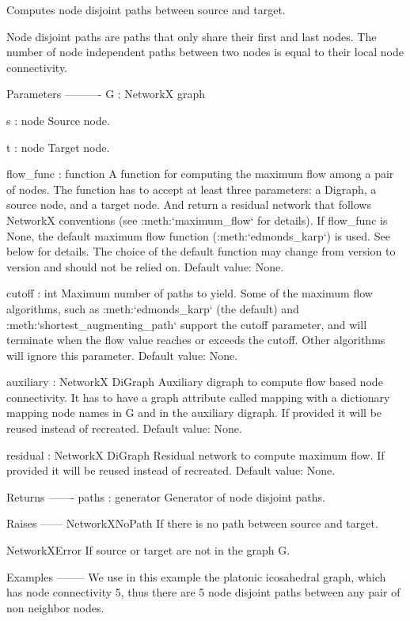 \begin{DoxyVerb}Computes node disjoint paths between source and target.

Node disjoint paths are paths that only share their first and last
nodes. The number of node independent paths between two nodes is
equal to their local node connectivity.

Parameters
----------
G : NetworkX graph

s : node
    Source node.

t : node
    Target node.

flow_func : function
    A function for computing the maximum flow among a pair of nodes.
    The function has to accept at least three parameters: a Digraph,
    a source node, and a target node. And return a residual network
    that follows NetworkX conventions (see :meth:`maximum_flow` for
    details). If flow_func is None, the default maximum flow function
    (:meth:`edmonds_karp`) is used. See below for details. The choice
    of the default function may change from version to version and
    should not be relied on. Default value: None.

cutoff : int
    Maximum number of paths to yield. Some of the maximum flow
    algorithms, such as :meth:`edmonds_karp` (the default) and
    :meth:`shortest_augmenting_path` support the cutoff parameter,
    and will terminate when the flow value reaches or exceeds the
    cutoff. Other algorithms will ignore this parameter.
    Default value: None.

auxiliary : NetworkX DiGraph
    Auxiliary digraph to compute flow based node connectivity. It has
    to have a graph attribute called mapping with a dictionary mapping
    node names in G and in the auxiliary digraph. If provided
    it will be reused instead of recreated. Default value: None.

residual : NetworkX DiGraph
    Residual network to compute maximum flow. If provided it will be
    reused instead of recreated. Default value: None.

Returns
-------
paths : generator
    Generator of node disjoint paths.

Raises
------
NetworkXNoPath
    If there is no path between source and target.

NetworkXError
    If source or target are not in the graph G.

Examples
--------
We use in this example the platonic icosahedral graph, which has node
connectivity 5, thus there are 5 node disjoint paths between any pair
of non neighbor nodes.


\end{DoxyVerb}
